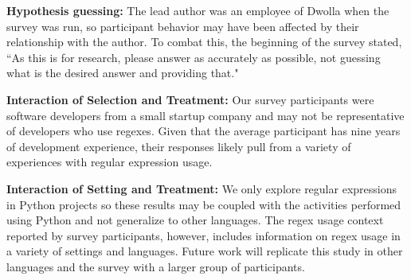 \documentclass{sig-alternate-05-2015}
\begin{document}

\textbf{Hypothesis guessing:} The lead author was an employee of Dwolla when the survey was run, so participant behavior may have been affected by their relationship with the author. To combat this, the beginning of the survey stated, ``As this is for research, please answer as accurately as possible, not guessing what is the desired answer and providing that."


\textbf{Interaction of Selection and Treatment:} Our survey participants were software developers from a small startup company and may not be representative of developers who use regexes. Given that the average participant has nine years of development experience, their responses likely pull from a variety of experiences with regular expression usage.

\textbf{Interaction of Setting and Treatment:}
We only explore regular expressions in Python projects so these results may be coupled with the activities performed using Python and not generalize to other languages. The regex usage context reported by survey participants, however, includes information on  regex usage in a  variety of settings and languages. Future work will replicate this study in other languages and the survey with a larger group of participants.



%
%
%
\end{document}
